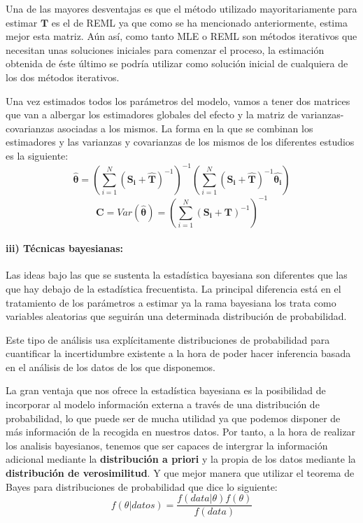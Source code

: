 \documentclass[a4paper,openright,12pt]{report}
\begin{document}
Una de las mayores desventajas es que el método utilizado mayoritariamente para estimar $\mathbf{T}$ es el de REML ya que como se ha mencionado anteriormente, estima mejor esta matriz. Aún así, como tanto MLE o REML son métodos iterativos que necesitan unas soluciones iniciales para comenzar el proceso, la estimación obtenida de éste último se podría utilizar como solución inicial de cualquiera de los dos métodos iterativos.

Una vez estimados todos los parámetros del modelo, vamos a tener dos matrices que van a albergar los estimadores globales del efecto y la matriz de varianzas-covarianzas asociadas a los mismos. La forma en la que se combinan los estimadores y las varianzas y covarianzas de los mismos de los diferentes estudios es la siguiente:
\begin{equation}
\mathbf{\widehat{\theta}}=(\sum_{i=1}^{N}(\mathbf{S_{i}}+\mathbf{\widehat{T}})^{-1})^{-1}(\sum_{i=1}^{N}(\mathbf{S_{i}}+\mathbf{\widehat{T}})^{-1}\mathbf{\widehat{\theta_{i}}})
\label{estinador_efectos}
\end{equation}
\begin{equation}
\mathbf{C}=Var(\mathbf{\widehat{\theta}})=(\sum_{i=1}^{N}(\mathbf{S_{i}}+\mathbf{T})^{-1})^{-1}
\label{est_var_cov}
\end{equation}
\newpage
\paragraph{iii) Técnicas bayesianas:} Las ideas bajo las que se sustenta la estadística bayesiana son diferentes que las que hay debajo de la estadística frecuentista. La principal diferencia está en el tratamiento de los parámetros a estimar ya la rama bayesiana los trata como variables aleatorias que seguirán una determinada distribución de probabilidad.

Este tipo de análisis usa explícitamente distribuciones de probabilidad para cuantificar la incertidumbre existente a la hora de poder hacer inferencia basada en el análisis de los datos de los que disponemos.

La gran ventaja que nos ofrece la estadística bayesiana es la posibilidad de incorporar al modelo información externa a través de una distribución de probabilidad, lo que puede ser de mucha utilidad ya que podemos disponer de más información de la recogida en nuestros datos. Por tanto, a la hora de realizar los analisis bayesianos, tenemos que ser capaces de intergrar la información adicional mediante la \textbf{distribución a priori} y la propia de los datos mediante la \textbf{distribución de verosimilitud}. Y que mejor manera que utilizar el teorema de Bayes para distribuciones de probabilidad que dice lo siguiente:
\begin{equation}
f(\theta \vert datos)=\frac{f(data\vert \theta)f(\theta)}{f(data)}
\label{bayes}
\end{equation}
\end{document}
